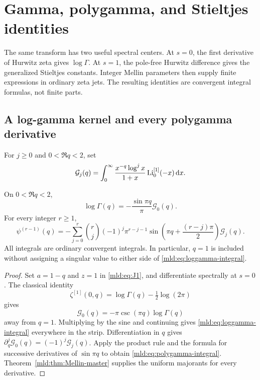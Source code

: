 \section{Gamma, polygamma, and Stieltjes identities}\label{mld:sec:jets}

The same transform has two useful spectral centers. At $s=0$, the first derivative of Hurwitz zeta gives $\log\Gamma$. At $s=1$, the pole-free Hurwitz difference gives the generalized Stieltjes constants. Integer Mellin parameters then supply finite expressions in ordinary zeta jets. The resulting identities are convergent integral formulas, not finite parts.

\subsection{A log-gamma kernel and every polygamma derivative}

For $j\ge0$ and $0<\Re q<2$, set
\begin{equation}\label{mld:eq:gamma-kernel}
 \mathcal G_j(q)=\int_0^\infty
       \frac{x^{-q}\log^j x}{1+x}\operatorname{Li}_0^{[1]}(-x)\,\mathrm{d} x.
\end{equation}

\begin{theorem}\label{mld:thm:gamma-kernel}
On $0<\Re q<2$,
\begin{equation}\label{mld:eq:loggamma-integral}
 \boxed{\displaystyle
 \log\Gamma(q)=-\frac{\sin\pi q}{\pi}\mathcal G_0(q).}
\end{equation}
For every integer $r\ge1$,
\begin{equation}\label{mld:eq:polygamma-integral}
 \psi^{(r-1)}(q)=
 -\sum_{j=0}^{r}\binom rj(-1)^j\pi^{r-j-1}
       \sin\!\left(\pi q+\frac{(r-j)\pi}{2}\right)\mathcal G_j(q).
\end{equation}
All integrals are ordinary convergent integrals. In particular, $q=1$ is included without assigning a singular value to either side of \eqref{mld:eq:loggamma-integral}.
\end{theorem}

\begin{proof}
Set $a=1-q$ and $z=1$ in \eqref{mld:eq:J1}, and differentiate spectrally at $s=0$. The classical identity
\[
 \zeta^{[1]}(0,q)=\log\Gamma(q)-\tfrac12\log(2\pi)
\]
gives
\[
 \mathcal G_0(q)=-\pi\csc(\pi q)\log\Gamma(q)
\]
away from $q=1$. Multiplying by the sine and continuing gives \eqref{mld:eq:loggamma-integral} everywhere in the strip. Differentiation in $q$ gives
$\partial_q^j\mathcal G_0(q)=(-1)^j\mathcal G_j(q)$.
Apply the product rule and the formula for successive derivatives of $\sin\pi q$ to obtain \eqref{mld:eq:polygamma-integral}. Theorem~\ref{mld:thm:Mellin-master} supplies the uniform majorants for every derivative.
\end{proof}

